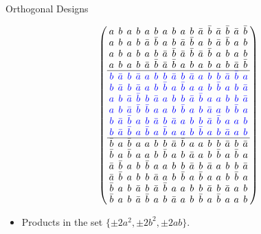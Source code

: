 \documentclass{beamer}
\newcommand{\bblue}[1]{\textcolor{blue}{#1}}
\begin{document}
\begin{frame}{Orthogonal Designs}

  \[
    \arraycolsep=2.0pt\def\arraystretch{0.75}
    \left(
      \begin{array}{cccccccccccccccc}
        a&b&a&b&a&b&a&b&a&b&\bar{a}&\bar{b}&\bar{a}&\bar{b}&\bar{a}&\bar{b}\\
        a&b&a&b&\bar{a}&\bar{b}&a&b&\bar{a}&\bar{b}&a&b&\bar{a}&\bar{b}&a&b\\
        a&b&a&b&a&b&\bar{a}&\bar{b}&\bar{a}&\bar{b}&\bar{a}&\bar{b}&a&b&a&b\\
        a&b&a&b&\bar{a}&\bar{b}&\bar{a}&\bar{b}&a&b&a&b&a&b&\bar{a}&\bar{b}\\ \hline
\bblue{b}&\bblue{\bar{a}}&\bblue{b}&\bblue{\bar{a}}&\bblue{a}&\bblue{b}&\bblue{b}&\bblue{\bar{a}}&\bblue{b}&\bblue{\bar{a}}&\bblue{a}&\bblue{b}&\bblue{b}&\bblue{\bar{a}}&\bblue{\bar{b}}&\bblue{a}\\
\bblue{b}&\bblue{\bar{a}}&\bblue{b}&\bblue{\bar{a}}&\bblue{a}&\bblue{b}&\bblue{\bar{b}}&\bblue{a}&\bblue{\bar{b}}&\bblue{a}&\bblue{a}&\bblue{b}&\bblue{\bar{b}}&\bblue{a}&\bblue{b}&\bblue{\bar{a}}\\
\bblue{a}&\bblue{b}&\bblue{\bar{a}}&\bblue{\bar{b}}&\bblue{b}&\bblue{\bar{a}}&\bblue{a}&\bblue{b}&\bblue{b}&\bblue{\bar{a}}&\bblue{\bar{b}}&\bblue{a}&\bblue{a}&\bblue{b}&\bblue{b}&\bblue{\bar{a}}\\
\bblue{a}&\bblue{b}&\bblue{\bar{a}}&\bblue{\bar{b}}&\bblue{\bar{b}}&\bblue{a}&\bblue{a}&\bblue{b}&\bblue{\bar{b}}&\bblue{a}&\bblue{b}&\bblue{\bar{a}}&\bblue{a}&\bblue{b}&\bblue{\bar{b}}&\bblue{a}\\
\bblue{b}&\bblue{\bar{a}}&\bblue{\bar{b}}&\bblue{a}&\bblue{b}&\bblue{\bar{a}}&\bblue{b}&\bblue{\bar{a}}&\bblue{a}&\bblue{b}&\bblue{b}&\bblue{\bar{a}}&\bblue{\bar{b}}&\bblue{a}&\bblue{a}&\bblue{b}\\
\bblue{b}&\bblue{\bar{a}}&\bblue{\bar{b}}&\bblue{a}&\bblue{\bar{b}}&\bblue{a}&\bblue{\bar{b}}&\bblue{a}&\bblue{a}&\bblue{b}&\bblue{\bar{b}}&\bblue{a}&\bblue{b}&\bblue{\bar{a}}&\bblue{a}&\bblue{b}\\ \hline
        \bar{b}&a&\bar{b}&a&a&b&b&\bar{a}&\bar{b}&a&a&b&b&\bar{a}&b&\bar{a}\\
        \bar{b}&a&\bar{b}&a&a&b&\bar{b}&a&b&\bar{a}&a&b&\bar{b}&a&\bar{b}&a\\
        \bar{a}&\bar{b}&a&b&\bar{b}&a&a&b&b&\bar{a}&b&\bar{a}&a&b&b&\bar{a}\\
        \bar{a}&\bar{b}&a&b&b&\bar{a}&a&b&\bar{b}&a&\bar{b}&a&a&b&\bar{b}&a\\
        \bar{b}&a&b&\bar{a}&b&\bar{a}&\bar{b}&a&a&b&b&\bar{a}&b&\bar{a}&a&b\\
        \bar{b}&a&b&\bar{a}&\bar{b}&a&b&\bar{a}&a&b&\bar{b}&a&\bar{b}&a&a&b\\
      \end{array}
    \right)
  \]

  \begin{itemize}
    \item Products in the set $\{\pm 2a^2, \pm 2b^2, \pm 2ab\}$.
  \end{itemize}

\end{frame}
\end{document}
